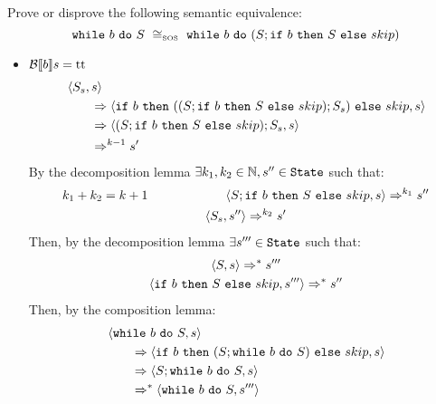 \begin{exercise}{
    Prove or disprove the following semantic equivalence:
    \[ \wwhile{b}{S}\ \SOScong\ \wwhile{b}{(S;\wif{b}{S}{skip})} \]
}
\begin{itemize}
\begin{itemize}
\begin{itemize}
\begin{align*}
                                \\&\qquad\Rightarrow \instr{\wif{b}{(S; \wwhile{b}{S})}{skip}}{s}
                                \\&\qquad\Rightarrow \instr{skip}{s}
                                \\&\qquad\Rightarrow s
                            \end{align*}
                        \item $\mathcal{B} \llbracket b \rrbracket s = \text{tt}$
                            \begin{align*}
                                &\left<S_s, s\right>
                                \\&\qquad\Rightarrow \left<\texttt{if}\ b\ \texttt{then}\ ((S;\texttt{if}\ b\ \texttt{then}\ S\ \texttt{else}\ skip);S_s)\ \texttt{else}\ skip, s\right>
                                \\&\qquad\Rightarrow \left<(S;\texttt{if}\ b\ \texttt{then}\ S\ \texttt{else}\ skip);S_s, s\right>
                                \\&\qquad\Rightarrow^{k - 1} s'
                            \end{align*}
                            By the decomposition lemma $\exists k_1, k_2 \in \mathbb{N}, s'' \in \texttt{State}$ such that:
                            \begin{gather*}
                                k_1 + k_2 = k + 1 \qquad\qquad\qquad \left<S;\texttt{if}\ b\ \texttt{then}\ S\ \texttt{else}\ skip, s\right> \Rightarrow^{k_1} s'' \\
                                \left<S_s, s''\right> \Rightarrow^{k_2} s'
                            \end{gather*}
                            Then, by the decomposition lemma $\exists s''' \in \texttt{State}$ such that:
                            \begin{gather*}
                                \left<S, s\right> \Rightarrow^* s''' \\
                                \left<\texttt{if}\ b\ \texttt{then}\ S\ \texttt{else}\ skip, s'''\right> \Rightarrow^* s''
                            \end{gather*}
                            Then, by the composition lemma:
                            \begin{align*}
                                &\instr{\wwhile{b}{S}}{s}
                                \\&\qquad\Rightarrow \instr{\wif{b}{(S; \wwhile{b}{S})}{skip}}{s}
                                \\&\qquad\Rightarrow \instr{S; \wwhile{b}{S}}{s}
                                \\&\qquad\Rightarrow^* \instr{\wwhile{b}{S}}{s'''}

\end{align*}
\end{itemize}
\end{itemize}
\end{itemize}
\end{exercise}
